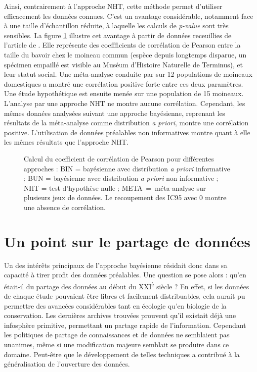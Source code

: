 \documentclass[11pt,twocolumn,twoside]{bopHomework}
\begin{document}
Ainsi, contrairement à l'approche NHT, cette méthode permet d'utiliser
efficacement les données connues.
C'est un avantage considérable, notamment face à une taille d'échantillon
réduite, à laquelle les calculs de \emph{p-value} sont très sensibles.
La figure \ref{fig:pearson} illustre cet avantage à partir de données
receuillies de l'article de \citet{garamszegi2009}.
Elle représente des coeffficients de corrélation de Pearson entre la taille du
bavoir chez le moineau commun (espèce depuis longtemps disparue, un spécimen
empaillé est visible au Muséum d'Histoire Naturelle de Terminus), et leur statut
social.
Une méta-analyse conduite par \citet{nakagawa2007} sur 12 populations de
moineaux domestiques a montré une corrélation positive forte entre ces deux
paramètres.
Une étude hypothétique est ensuite menée sur une population de 15 moineaux.
L'analyse par une approche NHT ne montre aucune corrélation.
Cependant, les mêmes données analysées suivant une approche bayésienne,
reprenant les résultats de la méta-analyse comme distribution \emph{a priori},
montre une corrélation positive.
L'utilisation de données préalables non informatives montre quant à elle les
mêmes résultats que l'approche NHT.

\begin{figure}[t]
  {\graphfont\centering}
  \caption{Calcul du coefficient de corrélation de Pearson pour différentes
    approches :
    BIN = bayésienne avec distribution \textit{a priori} informative ;
    BUN = bayésienne avec distribution \textit{a priori} non informative ;
    NHT = test d'hypothèse nulle ;
    META~=~méta-analyse sur plusieurs jeux de données.
    Le recoupement des IC95 avec 0 montre une absence de corrélation.
  }
  \label{fig:pearson}
\end{figure}


\section{Un point sur le partage de données}

Un des intérêts principaux de l'approche bayésienne résidait donc dans sa
capacité à tirer profit des données préalables.
Une question se pose alors : qu'en était-il du partage des données au début du
XXI\textsuperscript{è} siècle ?
En effet, si les données de chaque étude pouvaient être libres et facilement
distribuables, cela aurait pu permettre des avancées considérables tant en
écologie qu'en biologie de la conservation.
Les dernières archives trouvées prouvent qu'il existait déjà une infosphère
primitive, permettant un partage rapide de l'information.
Cependant les politiques de partage de connaissances et de données ne semblaient
pas unanimes, même si une modification majeure semblait se produire dans ce
domaine.
Peut-être que le développement de telles techniques a contribué à la
généralisation de l'ouverture des données.


\begin{scriptsize}
  
\end{scriptsize}
\end{document}
